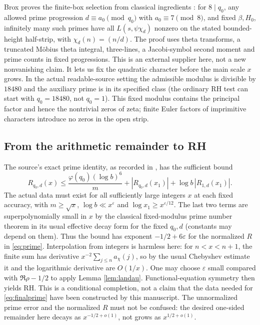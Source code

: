 \documentclass[11pt,a4paper]{article}
\begin{document}
Brox proves the finite-box selection from classical ingredients \cite{broxzero}: for $8\mid q_0$, any allowed prime progression $d\equiv a_0\pmod{q_0}$ with $a_0\equiv7\pmod8$, and fixed $\beta,H_0$, infinitely many such primes have all $L(s,\psi\chi_d)$ nonzero on the stated bounded-height half-strip, with $\chi_d(n)=(n/d)$. The proof uses theta transforms, a truncated M\"obius theta integral, three-lines, a Jacobi-symbol second moment and prime counts in fixed progressions. This is an external supplier here, not a new nonvanishing claim. It lets us fix the quadratic character before the main scale $x$ grows. In the actual readable-source setting the admissible modulus is divisible by $18480$ and the auxiliary prime is in its specified class (the ordinary RH test can start with $q_0=18480$, not $q_0=1$). This fixed modulus contains the principal factor and hence the nontrivial zeros of zeta; finite Euler factors of imprimitive characters introduce no zeros in the open strip.

\subsection{From the arithmetic remainder to RH}
The source's exact prime identity, as recorded in \cite{broxplan}, has the sufficient bound
\begin{equation}\label{eq:finalprime}
R_{q_0,d}(x)\leq \frac{\varphi(q_0)(\log b)^6}{m}+|R_{q_0,d}(x_1)|+\log b\,|R_{1,d}(x_1)|.
\end{equation}
The actual data must exist for all sufficiently large integers $x$ at each fixed accuracy, with $m\geq\sqrt{x}$, $\log b\ll x^\varepsilon$ and $\log x_1\geq x^{\varepsilon/12}$. The last two terms are superpolynomially small in $x$ by the classical fixed-modulus prime number theorem in its usual effective decay form for the fixed $q_0,d$ (constants may depend on them). Thus the bound has exponent $-1/2+6\varepsilon$ for the normalized $R$ in \eqref{eq:prime}. Interpolation from integers is harmless here: for $n<x<n+1$, the finite sum has derivative $x^{-2}\sum_{j\leq n}a_\chi(j)$, so by the usual Chebyshev estimate it and the logarithmic derivative are $O(1/x)$. One may choose $\varepsilon$ small compared with $\Re\rho-1/2$ to apply Lemma \ref{lem:landau}. Functional-equation symmetry then yields RH. This is a conditional completion, not a claim that the data needed for \eqref{eq:finalprime} have been constructed by this manuscript. The unnormalized prime error and the normalized $R$ must not be confused: the desired one-sided remainder here decays as $x^{-1/2+o(1)}$, not grows as $x^{1/2+o(1)}$.
\end{document}
